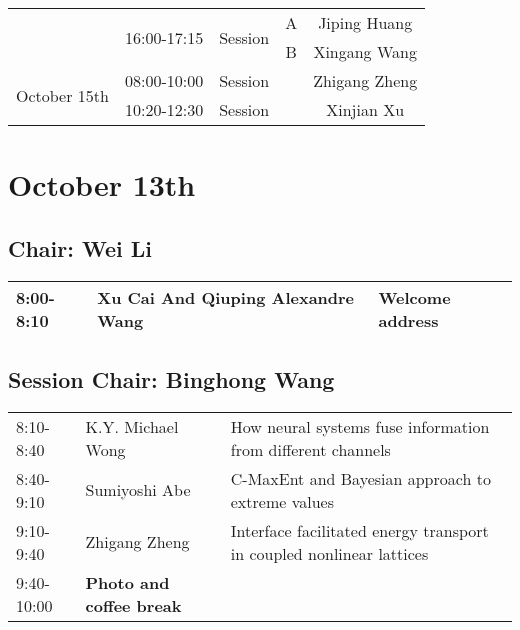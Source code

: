 \documentclass[oneside,A4paper,12pt]{article}
\begin{document}
\begin{center}
\begin{tabular}{|c|c|c|c|c|}
                              & \multirow{2}{*}{16:00-17:15} & \multirow{2}{*}{Session \uppercase\romannumeral 4} & A                 & Jiping Huang      \\ \cline{4-5} 
                              &                              &                                                    & B                 & Xingang Wang      \\ \hline
\multirow{2}{*}{October 15th} & 08:00-10:00                  & Session \uppercase\expandafter{\romannumeral 1}    & \multirow{2}{*}{} & Zhigang Zheng     \\ \cline{2-3} \cline{5-5} 
                              & 10:20-12:30                  & Session \uppercase\expandafter{\romannumeral 2}    &                   & Xinjian Xu        \\ \hline
\end{tabular}
\end{center}

\newpage

\section*{October 13th}
\label{sec:org565174e}

\subsection*{Chair: Wei Li}
\label{sec:org0dc6616}
\begin{center}
\begin{tabular}{p{2.5cm}p{7.5cm}p{4.5cm}}
\hline
\cellcolor{green!25}  8:00-8:10 & \cellcolor{green!25} Xu Cai And Qiuping Alexandre Wang & \cellcolor{green!25} Welcome address\\
\hline
\end{tabular}
\end{center}

\subsection*{Session \uppercase\expandafter{}  \hspace{10mm} Chair: Binghong Wang}
\label{sec:org0d3f1cd}
\begin{center}
\begin{tabular}{p{2.5cm}p{4.8cm}p{7.5cm}}
\hline
8:10-8:40 & K.Y. Michael Wong & How neural systems fuse information from different channels\\
8:40-9:10 & Sumiyoshi Abe & C-MaxEnt and Bayesian approach to extreme values\\
9:10-9:40 & Zhigang Zheng & Interface facilitated energy transport in coupled nonlinear lattices\\
\cellcolor{blue!25}9:40-10:00 & \cellcolor{blue!25}\textbf{Photo and coffee break} & \cellcolor{blue!25}\\
\hline
\end{tabular}
\end{center}
\end{document}
